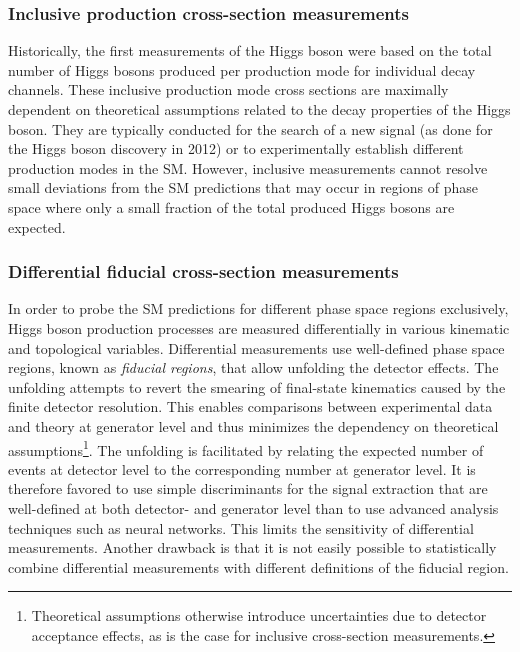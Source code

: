 \subsubsection{Inclusive production cross-section measurements}
Historically, the first measurements of the Higgs boson were based on the total number of Higgs bosons produced per production mode for individual decay channels.
These inclusive production mode cross sections are maximally dependent on theoretical assumptions related to the decay properties of the Higgs boson.
They are typically conducted for the search of a new signal (as done for the Higgs boson discovery in 2012) or to experimentally establish different production modes in the SM.
However, inclusive measurements cannot resolve small deviations from the SM predictions that may occur in regions of phase space where only a small fraction of the total produced Higgs bosons are expected.

\subsubsection{Differential fiducial cross-section measurements}
In order to probe the SM predictions for different phase space regions exclusively, Higgs boson production processes are measured differentially in various kinematic and topological variables.
Differential measurements use well-defined phase space regions, known as \emph{fiducial regions}, that allow unfolding the detector effects. 
The unfolding attempts to revert the smearing of final-state kinematics caused by the finite detector resolution.
This enables comparisons between experimental data and theory at generator level and thus minimizes the dependency on theoretical assumptions\footnote{Theoretical assumptions otherwise introduce uncertainties due to detector acceptance effects, as is the case for inclusive cross-section measurements.}.
The unfolding is facilitated by relating the expected number of events at detector level to the corresponding number at generator level. It is therefore favored to use simple discriminants for the signal extraction that are well-defined at both detector- and generator level than to use advanced analysis techniques such as neural networks. 
This limits the sensitivity of differential measurements.
Another drawback is that it is not easily possible to statistically combine differential measurements with different definitions of the fiducial region.  

